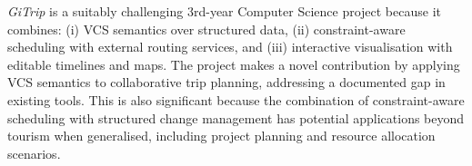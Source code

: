\textit{GiTrip} is a suitably challenging 3rd-year Computer Science project because it combines: (i) VCS semantics over structured data, (ii) constraint-aware scheduling with external routing services, and (iii) interactive visualisation with editable timelines and maps. The project makes a novel contribution by applying VCS semantics to collaborative trip planning, addressing a documented gap in existing tools. This is also significant because the combination of constraint-aware scheduling with structured change management has potential applications beyond tourism when generalised, including project planning and resource allocation scenarios.